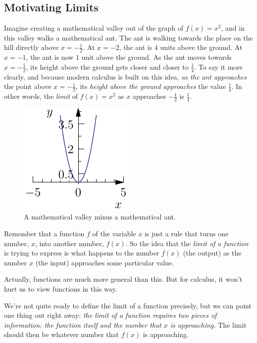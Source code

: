\documentclass[10pt,]{book}
\theoremstyle{ptxplainnotitle}
\theoremstyle{ptxplaintitle}
\theoremstyle{ptxplainnotitle}
\theoremstyle{ptxplaintitle}
\theoremstyle{ptxplainnotitle}
\theoremstyle{ptxplaintitle}
\theoremstyle{ptxdefinitionnotitle}
\theoremstyle{ptxdefinitiontitle}
\theoremstyle{ptxdefinitionnotitle}
\theoremstyle{ptxdefinitiontitle}
\theoremstyle{ptxdefinitionnotitle}
\theoremstyle{ptxdefinitiontitle}
\theoremstyle{ptxdefinitionnotitle}
\theoremstyle{ptxdefinitiontitle}
\theoremstyle{ptxdefinitionnotitle}
\theoremstyle{ptxdefinitiontitle}
\numberwithin{equation}{section}
\begin{document}
\subsection[{Motivating Limits}]{Motivating Limits}\label{subsection-motivating-limits}
\hypertarget{p-2}{}%
Imagine creating a mathematical valley out of the graph of \(f(x) = x^{2}\), and in this valley walks a mathematical ant. The ant is walking towards the place on the hill directly above \(x = -\frac{1}{2}\). At \(x=-2\), the ant is \(4\) units above the ground. At \(x=-1\), the ant is now \(1\) unit above the ground. As the ant moves towards \(x=-\frac{1}{2}\), its height above the ground gets closer and closer to \(\frac{1}{4}\). To say it more clearly, and because modern calculus is built on this idea, \emph{as the ant approaches} the point above \(x = -\frac{1}{2}\), its \emph{height above the ground approaches} the value \(\frac{1}{4}\). In other words, the \emph{limit} of \(f(x) = x^{2}\) as \(x\) approaches \(-\frac{1}{2}\) is \(\frac{1}{4}\).%
\begin{figure}
\centering
\includegraphics[width=0.5\linewidth]{images/image-1.pdf}
\caption{A mathematical valley minus a mathematical ant.\label{figure-math-valley}}
\end{figure}
\hypertarget{p-3}{}%
Remember that a function \(f\) of the variable \(x\) is just a rule that turns one number, \(x\), into another number, \(f(x)\). So the idea that the \emph{limit of a function} is trying to express is what happens to the number \(f(x)\) (the output) as the number \(x\) (the input) approaches some particular value.%
\begin{aside}{}\label{aside-1}
\hypertarget{p-4}{}%
Actually, functions are much more general than this. But for calculus, it won't hurt us to view functions in this way.%
\end{aside}
\hypertarget{p-5}{}%
We're not quite ready to define the limit of a function precisely, but we can point one thing out right away: \emph{the limit of a function requires two pieces of information: the function itself and the number that \(x\) is approaching.} The limit should then be whatever number that \(f(x)\) is approaching.%
\end{document}
